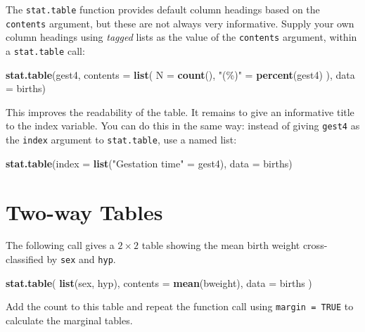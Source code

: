 \documentclass[
]{book}
\newenvironment{Shaded}{\begin{snugshade}}{\end{snugshade}}
\newcommand{\AttributeTok}[1]{\textcolor[rgb]{0.13,0.29,0.53}{#1}}
\newcommand{\FunctionTok}[1]{\textcolor[rgb]{0.13,0.29,0.53}{\textbf{#1}}}
\newcommand{\NormalTok}[1]{#1}
\newcommand{\OtherTok}[1]{\textcolor[rgb]{0.56,0.35,0.01}{#1}}
\newcommand{\StringTok}[1]{\textcolor[rgb]{0.31,0.60,0.02}{#1}}
\begin{document}
The \texttt{stat.table} function provides default column headings based
on the \texttt{contents} argument, but these are not always very informative.
Supply your own column headings using \emph{tagged} lists as the
value of the \texttt{contents} argument, within a \texttt{stat.table} call:

\begin{Shaded}
\begin{Highlighting}[]
\FunctionTok{stat.table}\NormalTok{(gest4, }\AttributeTok{contents =} \FunctionTok{list}\NormalTok{(}
  \AttributeTok{N =} \FunctionTok{count}\NormalTok{(),}
  \StringTok{"(\%)"} \OtherTok{=} \FunctionTok{percent}\NormalTok{(gest4)}
\NormalTok{), }\AttributeTok{data =}\NormalTok{ births)}
\end{Highlighting}
\end{Shaded}

This improves the readability of the table. It remains to give an
informative title to the index variable. You can do this in the same way:
instead of giving \texttt{gest4} as the \texttt{index} argument to \texttt{stat.table},
use a named list:

\begin{Shaded}
\begin{Highlighting}[]
\FunctionTok{stat.table}\NormalTok{(}\AttributeTok{index =} \FunctionTok{list}\NormalTok{(}\StringTok{"Gestation time"} \OtherTok{=}\NormalTok{ gest4), }\AttributeTok{data =}\NormalTok{ births)}
\end{Highlighting}
\end{Shaded}

\section{Two-way Tables}\label{two-way-tables}

The following call gives a \(2\times 2\) table showing the mean birth weight
cross-classified by \texttt{sex} and \texttt{hyp}.

\begin{Shaded}
\begin{Highlighting}[]
\FunctionTok{stat.table}\NormalTok{(}
  \FunctionTok{list}\NormalTok{(sex, hyp), }
  \AttributeTok{contents =} \FunctionTok{mean}\NormalTok{(bweight), }
  \AttributeTok{data =}\NormalTok{ births}
\NormalTok{)}
\end{Highlighting}
\end{Shaded}

Add the count to this table and repeat the function call using \texttt{margin\ =\ TRUE} to calculate the
marginal tables.
\end{document}
